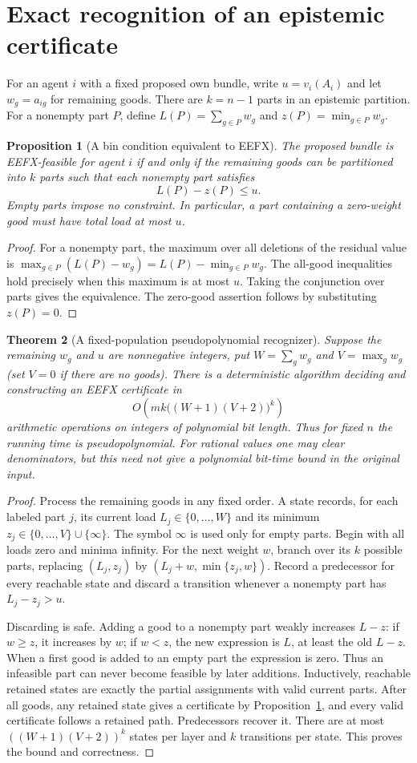\documentclass[11pt]{article}
\newtheorem{theorem}{Theorem}
\newtheorem{proposition}[theorem]{Proposition}
\theoremstyle{definition}
\begin{document}
\section{Exact recognition of an epistemic certificate}
For an agent $i$ with a fixed proposed own bundle, write
$u=v_i(A_i)$ and let $w_g=a_{ig}$ for remaining goods. There are $k=n-1$
parts in an epistemic partition. For a nonempty part $P$, define
$L(P)=\sum_{g\in P}w_g$ and $z(P)=\min_{g\in P}w_g$.
\begin{proposition}[A bin condition equivalent to EEFX]\label{bin}
The proposed bundle is EEFX-feasible for agent $i$ if and only if the
remaining goods can be partitioned into $k$ parts such that each nonempty
part satisfies
\[
 L(P)-z(P)\le u.
\]
Empty parts impose no constraint. In particular, a part containing a
zero-weight good must have total load at most $u$.
\end{proposition}
\begin{proof}
For a nonempty part, the maximum over all deletions of the residual value
is $\max_{g\in P}(L(P)-w_g)=L(P)-\min_{g\in P}w_g$.
The all-good inequalities hold precisely when this maximum is at most
$u$. Taking the conjunction over parts gives the equivalence. The
zero-good assertion follows by substituting $z(P)=0$.
\end{proof}
\begin{theorem}[A fixed-population pseudopolynomial recognizer]\label{dp}
Suppose the remaining $w_g$ and $u$ are nonnegative integers, put
$W=\sum_g w_g$ and $V=\max_g w_g$ (set $V=0$ if there are no goods).
There is a deterministic algorithm deciding and constructing an EEFX
certificate in
\[
 O\!\left(mk\bigl((W+1)(V+2)\bigr)^k\right)
\]
arithmetic operations on integers of polynomial bit length. Thus for
fixed $n$ the running time is pseudopolynomial. For rational values one
may clear denominators, but this need not give a polynomial bit-time
bound in the original input.
\end{theorem}
\begin{proof}
Process the remaining goods in any fixed order. A state records, for each
labeled part $j$, its current load $L_j\in\{0,\ldots,W\}$ and its minimum
$z_j\in\{0,\ldots,V\}\cup\{\infty\}$. The symbol $\infty$ is used
only for empty parts. Begin with all loads zero and minima infinity.
For the next weight $w$, branch over its $k$ possible parts, replacing
$(L_j,z_j)$ by $(L_j+w,\min\{z_j,w\})$. Record a predecessor for every
reachable state and discard a transition whenever a nonempty part has
$L_j-z_j>u$.

Discarding is safe. Adding a good to a nonempty part weakly increases
$L-z$: if $w\ge z$, it increases by $w$; if $w<z$, the new expression
is $L$, at least the old $L-z$. When a first good is added to an empty
part the expression is zero. Thus an infeasible part can never become
feasible by later additions. Inductively, reachable retained states are
exactly the partial assignments with valid current parts. After all
goods, any retained state gives a certificate by Proposition~\ref{bin},
and every valid certificate follows a retained path. Predecessors recover
it. There are at most $((W+1)(V+2))^k$ states per layer and $k$ transitions
per state. This proves the bound and correctness.
\end{proof}
\end{document}
